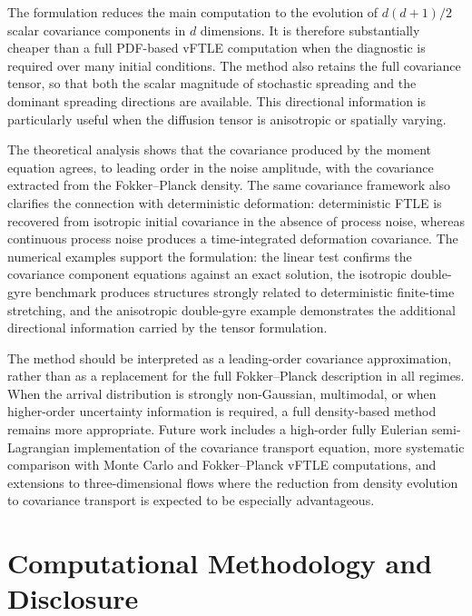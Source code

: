 \documentclass[a4paper,11pt]{article}
\numberwithin{equation}{section}
\theoremstyle{plain}
\theoremstyle{definition}
\theoremstyle{remark}
\begin{document}
The formulation reduces the main computation to the evolution of \(d(d+1)/2\) scalar covariance components in \(d\) dimensions.  It is therefore substantially cheaper than a full PDF-based vFTLE computation when the diagnostic is required over many initial conditions.  The method also retains the full covariance tensor, so that both the scalar magnitude of stochastic spreading and the dominant spreading directions are available.  This directional information is particularly useful when the diffusion tensor is anisotropic or spatially varying.

The theoretical analysis shows that the covariance produced by the moment equation agrees, to leading order in the noise amplitude, with the covariance extracted from the Fokker--Planck density.  The same covariance framework also clarifies the connection with deterministic deformation: deterministic FTLE is recovered from isotropic initial covariance in the absence of process noise, whereas continuous process noise produces a time-integrated deformation covariance.  The numerical examples support the formulation: the linear test confirms the covariance component equations against an exact solution, the isotropic double-gyre benchmark produces structures strongly related to deterministic finite-time stretching, and the anisotropic double-gyre example demonstrates the additional directional information carried by the tensor formulation.

The method should be interpreted as a leading-order covariance approximation, rather than as a replacement for the full Fokker--Planck description in all regimes.  When the arrival distribution is strongly non-Gaussian, multimodal, or when higher-order uncertainty information is required, a full density-based method remains more appropriate.  Future work includes a high-order fully Eulerian semi-Lagrangian implementation of the covariance transport equation, more systematic comparison with Monte Carlo and Fokker--Planck vFTLE computations, and extensions to three-dimensional flows where the reduction from density evolution to covariance transport is expected to be especially advantageous.

\section*{Computational Methodology and Disclosure}
\end{document}
